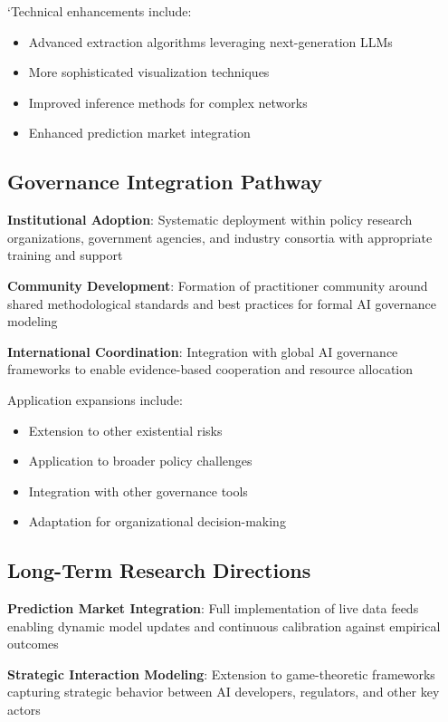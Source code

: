 \documentclass[
  11pt,
  letterpaper,
]{book}
\providecommand{\tightlist}{%
  \setlength{\itemsep}{0pt}\setlength{\parskip}{0pt}}
\begin{document}
`Technical enhancements include:

\begin{itemize}
\tightlist
\item
  Advanced extraction algorithms leveraging next-generation LLMs
\item
  More sophisticated visualization techniques
\item
  Improved inference methods for complex networks
\item
  Enhanced prediction market integration
\end{itemize}

\subsection{Governance Integration
Pathway}\label{sec-governance-pathway}

\textbf{Institutional Adoption}: Systematic deployment within policy
research organizations, government agencies, and industry consortia with
appropriate training and support

\textbf{Community Development}: Formation of practitioner community
around shared methodological standards and best practices for formal AI
governance modeling

\textbf{International Coordination}: Integration with global AI
governance frameworks to enable evidence-based cooperation and resource
allocation

Application expansions include:

\begin{itemize}
\tightlist
\item
  Extension to other existential risks
\item
  Application to broader policy challenges
\item
  Integration with other governance tools
\item
  Adaptation for organizational decision-making
\end{itemize}

\subsection{Long-Term Research Directions}\label{sec-long-term-research}

\textbf{Prediction Market Integration}: Full implementation of live data
feeds enabling dynamic model updates and continuous calibration against
empirical outcomes

\textbf{Strategic Interaction Modeling}: Extension to game-theoretic
frameworks capturing strategic behavior between AI developers,
regulators, and other key actors
\end{document}
